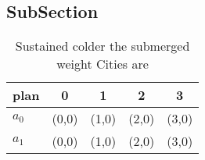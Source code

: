 \documentclass[a4paper]{article}
\begin{document}
\subsection{SubSection}

\begin{table}
\begin{adjustbox}{width=0.7\columnwidth}
\begin{tabular}{|l|l|l|l|l|}
\hline
\textbf{plan} & \multicolumn{1}{c|}{\textbf{0}} & \multicolumn{1}{c|}{\textbf{1}} & \multicolumn{1}{c|}{\textbf{2}} & \multicolumn{1}{c|}{\textbf{3}} \\ \hline
\textbf{$a_0$}  & (0,0) & (1,0) & (2,0) & (3,0) \\ \hline
\textbf{$a_1$}  & (0,0) & (1,0) & (2,0) & (3,0) \\ \hline
\end{tabular}
\end{adjustbox}
\caption{Sustained colder the submerged weight Cities are 
}
\end{table}
\end{document}
